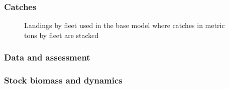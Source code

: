 \documentclass[
]{scrartcl}
\begin{document}
\subsubsection{Catches}\label{catches}

\clearpage



\begin{figure}


\caption{\label{fig-es-catch}Landings by fleet used in the base model
where catches in metric tons by fleet are stacked}

\end{figure}%

\clearpage

\subsubsection{Data and assessment}\label{data-and-assessment}

\subsubsection{Stock biomass and
dynamics}\label{stock-biomass-and-dynamics}

\clearpage 

\end{document}

